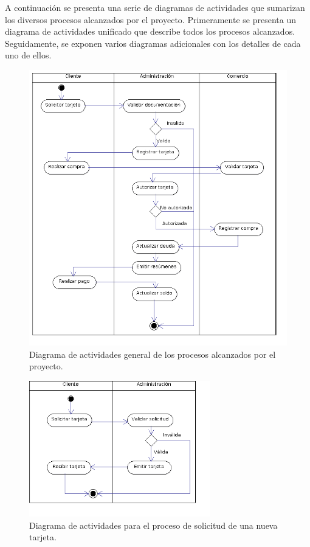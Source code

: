 A continuación se presenta una serie de diagramas de actividades que sumarizan
los diversos procesos alcanzados por el proyecto. Primeramente se presenta un
diagrama de actividades unificado que describe todos los procesos alcanzados.
Seguidamente, se exponen varios diagramas adicionales con los detalles de cada
uno de ellos.

\begin{figure}[htb]
\begin{center}
\includegraphics[width=\textwidth]{images/mod_negocio_act_global.png}
\end{center}
\caption{Diagrama de actividades general de los procesos alcanzados por el
proyecto.}
\end{figure}

\begin{figure}[htb]
\begin{center}
\includegraphics[width=0.7\textwidth]{images/mod_negocio_act_solicitudtarjeta.png}
\end{center}
\caption{Diagrama de actividades para el proceso de solicitud de una nueva
tarjeta.}
\end{figure}

